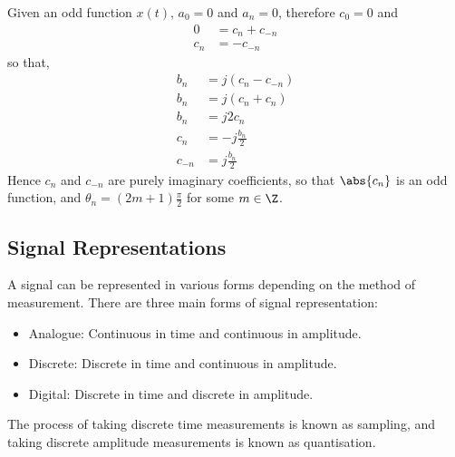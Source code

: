 \documentclass{article}
\begin{document}
Given an odd function \(x\left( t \right)\), \(a_0 = 0\) and \(a_n = 0\), therefore \(c_0 = 0\) and
\begin{align*}
    0   & = c_n + c_{-n} \\
    c_n & = -c_{-n}
\end{align*}
so that,
\begin{align*}
    b_n    & = j \left( c_n - c_{-n} \right) \\
    b_n    & = j \left( c_n + c_n \right)    \\
    b_n    & = j 2 c_n                       \\
    c_n    & = -j \frac{b_n}{2}              \\
    c_{-n} & = j \frac{b_n}{2}
\end{align*}
Hence \(c_n\) and \(c_{-n}\) are purely imaginary coefficients, so that \(\abs{c_n}\) is an odd function, and \(\theta_n = \left( 2m + 1 \right) \frac{\pi}{2}\) for some \(m \in \Z\).
\subsection{Signal Representations}
A signal can be represented in various forms depending on the method of measurement. There are three main forms of signal representation:
\begin{itemize}
    \item Analogue: Continuous in time and continuous in amplitude.
    \item Discrete: Discrete in time and continuous in amplitude.
    \item Digital: Discrete in time and discrete in amplitude.
\end{itemize}
The process of taking discrete time measurements is known as sampling, and taking discrete amplitude measurements is known as quantisation.
\end{document}

